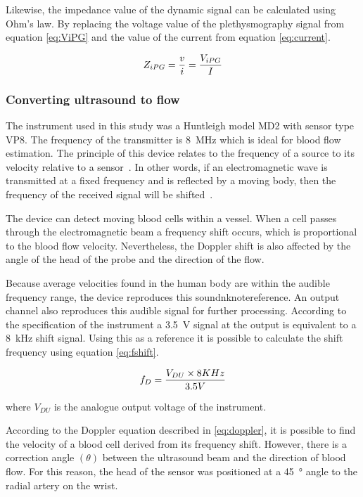
Likewise, the impedance value of the dynamic signal can be calculated using Ohm's law. By replacing the voltage value of the plethysmography signal from equation \ref{eq:ViPG} and the value of the current from equation \ref{eq:current}.

\begin{align}
	\label{eq:zipg}
	Z_{iPG}=\frac{v}{i} = \frac{V_{iPG}}{I} \tagaddtext{[\si{\ohm}]}
\end{align}

\subsubsection{Converting ultrasound to flow}
\label{sectionDU}
The instrument used in this study was a Huntleigh model MD2 with sensor type VP8. The frequency of the transmitter is \SI{8}{\mega\hertz} which is ideal for blood flow estimation. The principle of this device relates to the frequency of a source to its velocity relative to a sensor~\cite{surgeonhand2002Hand}.  In other words, if an electromagnetic wave is transmitted at a fixed frequency and is reflected by a moving body, then the frequency of the received signal will be shifted~\cite{ht:MD2}.  

The device can detect moving blood cells within a vessel.  When a cell passes through the electromagnetic beam a frequency shift occurs, which is proportional to the blood flow velocity. Nevertheless, the Doppler shift is also affected by the angle of the head of the probe and the direction of the flow.

Because average velocities found in the human body are within the audible frequency range, the device reproduces this soundnknote{reference}. An output channel also reproduces this audible signal for further processing. According to the specification of the instrument a \SI{3.5}{\volt} signal at the output is equivalent to a \SI{8}{\kilo\hertz} shift signal. Using this as a reference it is possible to calculate the shift frequency using equation \ref{eq:fshift}.

\begin{align}
	\label{eq:fshift}
	f_D = \frac{V_{DU} \times 8 KHz}{3.5V} \tagaddtext{[\si{\hertz}]}
\end{align}  

where $V_{DU}$ is the analogue output voltage of the instrument. 

According to the Doppler equation described in \ref{eq:doppler}, it is possible to find the velocity of a blood cell derived from its frequency shift. However, there is a correction angle $(\theta)$ between the ultrasound beam and the direction of blood flow. For this reason, the head of the sensor was positioned at a \SI{45}{\degree} angle to the radial artery on the wrist.

